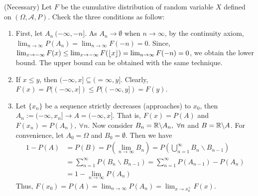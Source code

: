 \documentclass[Probability_Theory.tex]{subfiles}
\begin{document}
(Necessary)
Let $F$ be the cumulative distribution of random variable $X$ defined on $(\Omega,\mathcal{A},P)$. Check the three conditions as follow:
\begin{enumerate}
	\item First, let $A_n \ (-\infty,-n]$. As $A_n\rightarrow\emptyset$ when $n\rightarrow\infty$, by the continuity axiom, $\lim_{n\rightarrow\infty}P(A_n) = \lim_{n\rightarrow\infty}F(-n)=0$. Since, $\lim_{x\rightarrow-\infty}F(x)\leq\lim_{x\rightarrow-\infty}F(\floor*{x})=\lim_{n\rightarrow\infty}F(-n)=0$, we obtain the lower bound. The upper bound can be obtained with the same technique.
	\item If $x\leq y$, then $(-\infty,x]\subseteq(=\infty,y]$. Clearly, $F(x) = P((-\infty,x])\leq P((-\infty,y])=F(y)$.
	\item Let $\{x_n\}$ be a sequence strictly decreases (approaches) to $x_0$, then $A_n:=(-\infty,x_n]\rightarrow A = (-\infty,x]$. That is, $F(x) = P(A)$ and $F(x_n) = P(A_n),\ \forall n$. Now consider $B_n=\R\backslash A_n,\ \forall n$ and $B=\R\backslash A$. For convenience, let $A_0 = \Omega$ and $B_0 = \emptyset$. Then we have
	\begin{align*}
	1-P(A) &= P(B) = P(\lim_{n\rightarrow\infty}B_n) = P(\bigcup_{n=1}^{\infty}B_n\backslash B_{n-1})\\
	&=\sum_{n=1}^{\infty} P(B_n\backslash B_{n-1}) = \sum_{n=1}^{\infty} P(A_{n-1}) - P(A_n)\\
	& = 1-\lim_{n\rightarrow\infty}P(A_n)
	\end{align*}
	Thus, $F(x_0) = P(A) = \lim_{n\rightarrow\infty}P(A_n) = \lim_{x\rightarrow x_0^+}F(x)$.
\end{enumerate}
\end{document}
